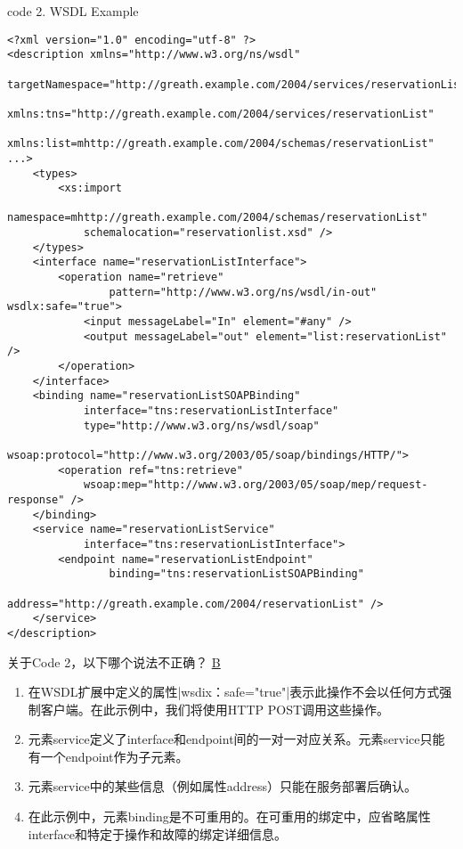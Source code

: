 \begin{center}
\vspace{-1em}
code 2. WSDL Example
\vspace{-0.8em}
\end{center}
\begin{lstlisting}
<?xml version="1.0" encoding="utf-8" ?>
<description xmlns="http://www.w3.org/ns/wsdl"
        targetNamespace="http://greath.example.com/2004/services/reservationList" 
        xmlns:tns="http://greath.example.com/2004/services/reservationList"
        xmlns:list=mhttp://greath.example.com/2004/schemas/reservationList" ...>
    <types>
        <xs:import
            namespace=mhttp://greath.example.com/2004/schemas/reservationList"
            schemalocation="reservationlist.xsd" />
    </types>
    <interface name="reservationListInterface">
        <operation name="retrieve"
                pattern="http://www.w3.org/ns/wsdl/in-out" wsdlx:safe="true">
            <input messageLabel="In" element="#any" />
            <output messageLabel="out" element="list:reservationList" />
        </operation> 
    </interface>
    <binding name="reservationListSOAPBinding"
            interface="tns:reservationListInterface"
            type="http://www.w3.org/ns/wsdl/soap"
            wsoap:protocol="http://www.w3.org/2003/05/soap/bindings/HTTP/">
        <operation ref="tns:retrieve"
            wsoap:mep="http://www.w3.org/2003/05/soap/mep/request-response" />
    </binding>
    <service name="reservationListService"
            interface="tns:reservationListInterface">
        <endpoint name="reservationListEndpoint" 
                binding="tns:reservationListSOAPBinding"
                address="http://greath.example.com/2004/reservationList" />
    </service>
</description>
\end{lstlisting}


\begin{problem}
关于Code 2，以下哪个说法不正确？
\uline{B}
    \begin{enumerate}[label=\Alph*.]
        \item 在WSDL扩展中定义的属性\sverb|wsdix：safe="true"|\;表示此操作不会以任何方式强制客户端。在此示例中，我们将使用HTTP POST调用这些操作。
        \item 元素service定义了interface和endpoint间的一对一对应关系。元素service只能有一个endpoint作为子元素。
        \item 元素service中的某些信息（例如属性address）只能在服务部署后确认。
        \item 在此示例中，元素binding是不可重用的。在可重用的绑定中，应省略属性interface和特定于操作和故障的绑定详细信息。
    \end{enumerate}
\end{problem}

